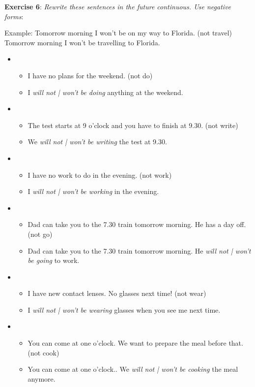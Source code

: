 \textbf{Exercise 6}: \textit{Rewrite these sentences in the future continuous. Use negative forms}:

Example:
Tomorrow morning I won't be on my way to Florida. (not travel)
Tomorrow morning I won't be travelling to Florida.

\begin{itemize}

\item
\begin{itemize}
\item I have no plans for the weekend. (not do)
\item I \textit{will not | won't be doing} anything at the weekend.
\end{itemize}

\item
\begin{itemize}
\item The test starts at 9 o'clock and you have to finish at 9.30. (not write)
\item We \textit{will not | won't be writing} the test at 9.30.
\end{itemize}

\item
\begin{itemize}
\item I have no work to do in the evening. (not work)
\item I \textit{will not | won't be working} in the evening.
\end{itemize}

\item
\begin{itemize}
\item Dad can take you to the 7.30 train tomorrow morning. He has a day off. (not go)
\item Dad can take you to the 7.30 train tomorrow morning. He \textit{will not | won't be going} to work.
\end{itemize}

\item
\begin{itemize}
\item I have new contact lenses. No glasses next time! (not wear)
\item I \textit{will not | won't be wearing} glasses when you see me next time.
\end{itemize}

\item
\begin{itemize}
\item You can come at one o'clock. We want to prepare the meal before that. (not cook)
\item You can come at one o'clock.. We \textit{will not | won't be cooking} the meal anymore.
\end{itemize}


\end{itemize}
